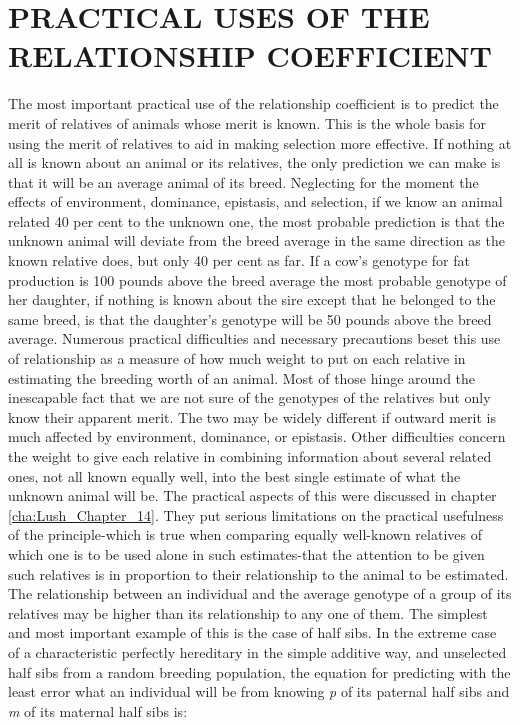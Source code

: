 \section*{PRACTICAL USES OF THE RELATIONSHIP COEFFICIENT}

The most important practical use of the relationship coefficient is to
predict the merit of relatives of animals whose merit is known. This is
the whole basis for using the merit of relatives to aid in making selection
more effective. If nothing at all is known about an animal or its
relatives, the only prediction we can make is that it will be an average
animal of its breed. Neglecting for the moment the effects of environment,
dominance, epistasis, and selection, if we know an animal related
40 per cent to the unknown one, the most probable prediction is that
the unknown animal will deviate from the breed average in the same
direction as the known relative does, but only 40 per cent as far. If a
cow's genotype for fat production is 100 pounds above the breed average
the most probable genotype of her daughter, if nothing is known
about the sire except that he belonged to the same breed, is that the
daughter's genotype will be 50 pounds above the breed average.
Numerous practical difficulties and necessary precautions beset this use
of relationship as a measure of how much weight to put on each relative
in estimating the breeding worth of an animal. Most of those hinge
around the inescapable fact that we are not sure of the genotypes of the
relatives but only know their apparent merit. The two may be widely
different if outward merit is much affected by environment, dominance,
or epistasis. Other difficulties concern the weight to give each relative in
combining information about several related ones, not all known equally
well, into the best single estimate of what the unknown animal will
be. The practical aspects of this were discussed in chapter \ref{cha:Lush_Chapter_14}. They put
serious limitations on the practical usefulness of the principle-which is
true when comparing equally well-known relatives of which one is to
be used alone in such estimates-that the attention to be given such
relatives is in proportion to their relationship to the animal to be estimated.
The relationship between an individual and the average genotype
of a group of its relatives may be higher than its relationship to
any one of them. The simplest and most important example of this is
the case of half sibs. In the extreme case of a characteristic perfectly
hereditary in the simple additive way, and unselected half sibs from a
random breeding population, the equation for predicting with the
least error what an individual will be from knowing \textit{p} of its paternal
half sibs and \textit{m} of its maternal half sibs is:

